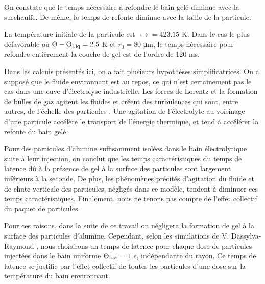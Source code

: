 On constate que le temps nécessaire à refondre le bain gelé
diminue avec la surchauffe. De même, le temps de refonte diminue avec
la taille de la particule.

La température initiale de la particule est $\tinj =
423.15$ \si{\kelvin}. Dans le cas le plus défavorable où $\Theta -
\Theta_\text{Liq} = 2.5$ \si{\kelvin} et $r_0 = 80$ \si{\micro\meter}, le
temps nécessaire pour refondre entièrement la couche de gel est de
l'ordre de 120 \si{\milli\second}.

Dans les calculs présentés ici, on a fait plusieurs hypothèses
simplificatrices. On a supposé que le fluide environnant est au
repos, ce qui n'est certainement pas le cas dans une cuve
d'électrolyse industrielle. Les forces de Lorentz et la formation de
bulles de gaz agitent les fluides et créent des turbulences qui sont,
entre autres, de l'échelle des particules \cite{Rochat2016}. Une
agitation de l'électrolyte au voisinage d'une particule accélère le
transport de l'énergie thermique, et tend à accélérer la refonte du
bain gelé.

Pour des particules d'alumine suffisamment isolées dans le bain
électrolytique suite à leur injection, on conclut que les temps
caractéristiques du temps de latence dû à la présence de gel à
la surface des particules sont largement inférieurs à la seconde. De
plus, les phénomènes précités d'agitation du fluide et de
chute verticale des particules, négligés dans ce modèle, tendent à
diminuer ces temps caractéristiques. Finalement, nous ne tenons pas
compte de l'effet collectif du paquet de particules.

Pour ces raisons, dans la suite de ce travail on négligera la
formation de gel à la surface des particules d'alumine. Cependant,
selon les simulations de V. Dassylva-Raymond \cite{Dassylva2015}, nous
choisirons un temps de latence pour chaque dose de particules
injectées dans le bain uniforme $\Theta_\text{Lat} = 1$ \si{\second}, indépendante
du rayon. Ce temps de latence se justifie par l'effet collectif de
toutes les particules d'une dose sur la température du bain
environnant.
